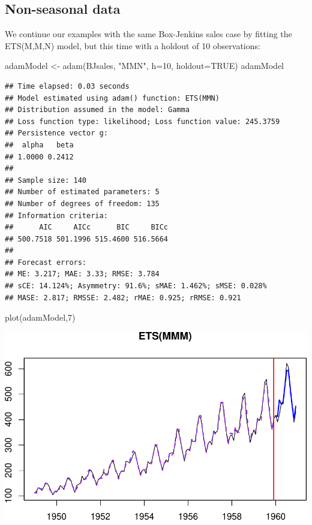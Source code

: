 \documentclass[
]{book}
\newenvironment{Shaded}{\begin{snugshade}}{\end{snugshade}}
\newcommand{\AttributeTok}[1]{\textcolor[rgb]{0.77,0.63,0.00}{#1}}
\newcommand{\ConstantTok}[1]{\textcolor[rgb]{0.00,0.00,0.00}{#1}}
\newcommand{\DecValTok}[1]{\textcolor[rgb]{0.00,0.00,0.81}{#1}}
\newcommand{\FunctionTok}[1]{\textcolor[rgb]{0.00,0.00,0.00}{#1}}
\newcommand{\NormalTok}[1]{#1}
\newcommand{\OtherTok}[1]{\textcolor[rgb]{0.56,0.35,0.01}{#1}}
\newcommand{\StringTok}[1]{\textcolor[rgb]{0.31,0.60,0.02}{#1}}
\theoremstyle{definition}
\theoremstyle{definition}
\theoremstyle{definition}
\theoremstyle{definition}
\theoremstyle{remark}
\begin{document}
\hypertarget{non-seasonal-data-1}{%
\subsection{Non-seasonal data}\label{non-seasonal-data-1}}

We continue our examples with the same Box-Jenkins sales case by fitting the ETS(M,M,N) model, but this time with a holdout of 10 observations:

\begin{Shaded}
\begin{Highlighting}[]
\NormalTok{adamModel }\OtherTok{\textless{}{-}} \FunctionTok{adam}\NormalTok{(BJsales, }\StringTok{"MMN"}\NormalTok{, }\AttributeTok{h=}\DecValTok{10}\NormalTok{, }\AttributeTok{holdout=}\ConstantTok{TRUE}\NormalTok{)}
\NormalTok{adamModel}
\end{Highlighting}
\end{Shaded}

\begin{verbatim}
## Time elapsed: 0.03 seconds
## Model estimated using adam() function: ETS(MMN)
## Distribution assumed in the model: Gamma
## Loss function type: likelihood; Loss function value: 245.3759
## Persistence vector g:
##  alpha   beta 
## 1.0000 0.2412 
## 
## Sample size: 140
## Number of estimated parameters: 5
## Number of degrees of freedom: 135
## Information criteria:
##      AIC     AICc      BIC     BICc 
## 500.7518 501.1996 515.4600 516.5664 
## 
## Forecast errors:
## ME: 3.217; MAE: 3.33; RMSE: 3.784
## sCE: 14.124%; Asymmetry: 91.6%; sMAE: 1.462%; sMSE: 0.028%
## MASE: 2.817; RMSSE: 2.482; rMAE: 0.925; rRMSE: 0.921
\end{verbatim}

\begin{Shaded}
\begin{Highlighting}[]
\FunctionTok{plot}\NormalTok{(adamModel,}\DecValTok{7}\NormalTok{)}
\end{Highlighting}
\end{Shaded}

\includegraphics{adam_files/figure-latex/unnamed-chunk-35-1.pdf}
\end{document}
